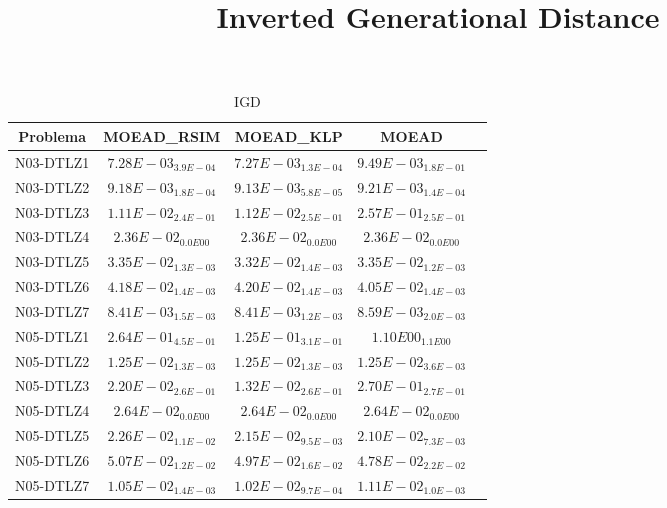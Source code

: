 \documentclass{article}
\title{Inverted Generational Distance}
\author{}
\begin{document}
\maketitle
\begin{table*}[ht!]
\scriptsize
\caption{IGD}
\centering\begin{tabular}{|c||c||c||c||c|} \hline
Problema &MOEAD_RSIM &MOEAD_KLP &MOEAD\\\hline
N03-DTLZ1 &\cellcolor{gray25}$7.28E-03_{3.9E-04}$ &\cellcolor{gray95}$7.27E-03_{1.3E-04}$ &$9.49E-03_{1.8E-01}$\\ 
\hline
N03-DTLZ2 &\cellcolor{gray25}$9.18E-03_{1.8E-04}$ &\cellcolor{gray95}$9.13E-03_{5.8E-05}$ &$9.21E-03_{1.4E-04}$\\ 
\hline
N03-DTLZ3 &\cellcolor{gray95}$1.11E-02_{2.4E-01}$ &\cellcolor{gray25}$1.12E-02_{2.5E-01}$ &$2.57E-01_{2.5E-01}$\\ 
\hline
N03-DTLZ4 &\cellcolor{gray95}$2.36E-02_{0.0E00}$ &\cellcolor{gray25}$2.36E-02_{0.0E00}$ &$2.36E-02_{0.0E00}$\\ 
\hline
N03-DTLZ5 &\cellcolor{gray25}$3.35E-02_{1.3E-03}$ &\cellcolor{gray95}$3.32E-02_{1.4E-03}$ &$3.35E-02_{1.2E-03}$\\ 
\hline
N03-DTLZ6 &\cellcolor{gray25}$4.18E-02_{1.4E-03}$ &$4.20E-02_{1.4E-03}$ &\cellcolor{gray95}$4.05E-02_{1.4E-03}$\\ 
\hline
N03-DTLZ7 &\cellcolor{gray95}$8.41E-03_{1.5E-03}$ &\cellcolor{gray25}$8.41E-03_{1.2E-03}$ &$8.59E-03_{2.0E-03}$\\ 
\hline
N05-DTLZ1 &\cellcolor{gray25}$2.64E-01_{4.5E-01}$ &\cellcolor{gray95}$1.25E-01_{3.1E-01}$ &$1.10E00_{1.1E00}$\\ 
\hline
N05-DTLZ2 &\cellcolor{gray95}$1.25E-02_{1.3E-03}$ &\cellcolor{gray25}$1.25E-02_{1.3E-03}$ &$1.25E-02_{3.6E-03}$\\ 
\hline
N05-DTLZ3 &\cellcolor{gray25}$2.20E-02_{2.6E-01}$ &\cellcolor{gray95}$1.32E-02_{2.6E-01}$ &$2.70E-01_{2.7E-01}$\\ 
\hline
N05-DTLZ4 &\cellcolor{gray95}$2.64E-02_{0.0E00}$ &\cellcolor{gray25}$2.64E-02_{0.0E00}$ &$2.64E-02_{0.0E00}$\\ 
\hline
N05-DTLZ5 &$2.26E-02_{1.1E-02}$ &\cellcolor{gray25}$2.15E-02_{9.5E-03}$ &\cellcolor{gray95}$2.10E-02_{7.3E-03}$\\ 
\hline
N05-DTLZ6 &$5.07E-02_{1.2E-02}$ &\cellcolor{gray25}$4.97E-02_{1.6E-02}$ &\cellcolor{gray95}$4.78E-02_{2.2E-02}$\\ 
\hline
N05-DTLZ7 &\cellcolor{gray25}$1.05E-02_{1.4E-03}$ &\cellcolor{gray95}$1.02E-02_{9.7E-04}$ &$1.11E-02_{1.0E-03}$\\ 

\end{tabular}
\end{table*}
\end{document}
